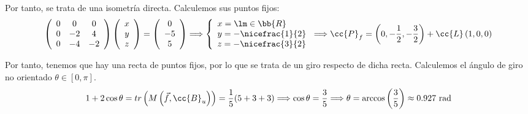 \begin{ejercicio}
    Por tanto, se trata de una isometría directa. Calculemos sus puntos fijos:
    \begin{equation*}
        \left(
        \begin{array}{ccc}
            0 & 0 & 0 \\
            0 & -2 & 4 \\
            0 & -4 & -2
        \end{array}
        \right)
        \left(
        \begin{array}{c}
            x \\ y \\ z
        \end{array}
        \right)
        = \left(
        \begin{array}{c}
            0 \\ -5 \\ 5
        \end{array}
        \right) \Longrightarrow \left\{\begin{array}{l}
            x = \lm \in \bb{R}\\
            y = -\nicefrac{1}{2}\\
            z = -\nicefrac{3}{2}
        \end{array}\right. \Longrightarrow \cc{P}_f = \left(0, -\frac{1}{2}, -\frac{3}{2}\right) + \cc{L}\left(1,0,0\right)
    \end{equation*}

    Por tanto, tenemos que hay una recta de puntos fijos, por lo que se trata de un giro respecto de dicha recta. Calculemos el ángulo de giro no orientado $\theta \in [0, \pi]$.
    \begin{equation*}
        1+2\cos\theta = tr\left(M\left(\vec{f}, \cc{B}_u\right)\right) = \frac{1}{5}(5+3+3) \Longrightarrow \cos\theta = \frac{3}{5} \Longrightarrow \theta = \arccos\left(\frac{3}{5}\right) \approx 0.927 \text{ rad}
    \end{equation*}
\end{ejercicio}

